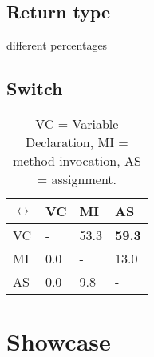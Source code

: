 \subsection{Return type}

different percentages

\subsection{Switch}

\begin{table}[h]
\begin{tabular}{ | m{1cm} | m{1cm} | m{1cm} | m{1cm} | }
  \hline
  \(\leftrightarrow\) & VC & MI & AS \\
  \hline
  \hline
  VC & - & 53.3 & \textbf{59.3} \\
  \hline
  MI & 0.0 & - & 13.0 \\
  \hline
  AS & 0.0 & 9.8 & - \\
  \hline
\end{tabular}
\caption{VC = Variable Declaration, MI = method invocation, AS = assignment.}
\label{switch_table}
\end{table}

\section{Showcase}

